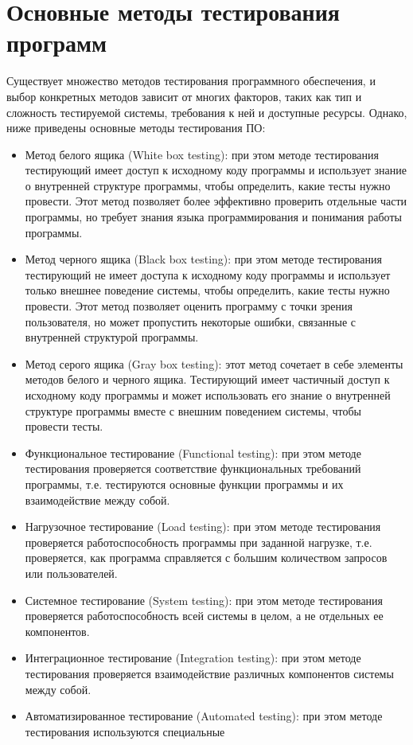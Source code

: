 \section{Основные методы тестирования программ}
Существует множество методов тестирования программного обеспечения, и выбор конкретных методов зависит от многих факторов, таких как тип и сложность тестируемой системы, требования к ней и доступные ресурсы. Однако, ниже приведены основные методы тестирования ПО:
\begin{itemize}
    \item Метод белого ящика (White box testing): при этом методе тестирования тестирующий имеет доступ к исходному коду программы и использует знание о внутренней структуре программы, чтобы определить, какие тесты нужно провести. Этот метод позволяет более эффективно проверить отдельные части программы, но требует знания языка программирования и понимания работы программы.

    \item Метод черного ящика (Black box testing): при этом методе тестирования тестирующий не имеет доступа к исходному коду программы и использует только внешнее поведение системы, чтобы определить, какие тесты нужно провести. Этот метод позволяет оценить программу с точки зрения пользователя, но может пропустить некоторые ошибки, связанные с внутренней структурой программы.

    \item Метод серого ящика (Gray box testing): этот метод сочетает в себе элементы методов белого и черного ящика. Тестирующий имеет частичный доступ к исходному коду программы и может использовать его знание о внутренней структуре программы вместе с внешним поведением системы, чтобы провести тесты.

    \item Функциональное тестирование (Functional testing): при этом методе тестирования проверяется соответствие функциональных требований программы, т.е. тестируются основные функции программы и их взаимодействие между собой.

    \item Нагрузочное тестирование (Load testing): при этом методе тестирования проверяется работоспособность программы при заданной нагрузке, т.е. проверяется, как программа справляется с большим количеством запросов или пользователей.

    \item Системное тестирование (System testing): при этом методе тестирования проверяется работоспособность всей системы в целом, а не отдельных ее компонентов.

    \item Интеграционное тестирование (Integration testing): при этом методе тестирования проверяется взаимодействие различных компонентов системы между собой.

    \item Автоматизированное тестирование (Automated testing): при этом методе тестирования используются специальные
    \end{itemize}
